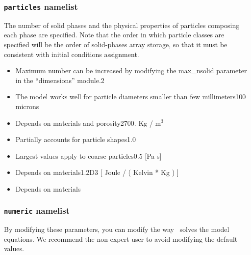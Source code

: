 \subsubsection{{\tt particles} namelist}
The number of solid phases and the physical properties of particles 
composing each phase are specified. Note that the order in which 
particle classes are specified will be the order of solid-phases array 
storage, so that it must be consistent with initial conditions assignment.

\begin{itemize}

\item
{}
{Maximum number can be increased by modifying the max\_nsolid parameter
in the ``dimensions'' module.}{2}

\item
{}
{The model works well for particle diameters smaller than few millimeters}{100 microns}

\item
{}
{Depends on materials and porosity}{2700. Kg / m$^3$}

\item
{}
{Partially accounts for particle shapes}{1.0}

\item
{}
{Largest values apply to coarse particles}{0.5 [Pa s]}

\item
{}
{Depends on materials}{1.2D3 [ Joule / ( Kelvin * Kg ) ]}

\item
{}
{Depends on materials}

\end{itemize}

\subsubsection{{\tt numeric} namelist}
By modifying these parameters, you can modify the way \PDAC\ solves the 
model equations. We recommend the non-expert user to avoid modifying the
default values.

